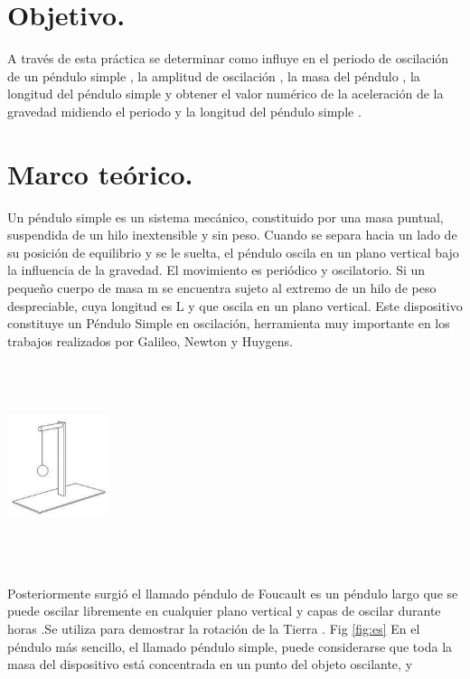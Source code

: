 \documentclass[10pt]{article}
\begin{document}
\begin{multicols}{2}

\section{Objetivo.}
A través de esta práctica se determinar como influye en el periodo de oscilación de un péndulo simple  , la amplitud de oscilación , la masa del péndulo , la longitud del péndulo simple y obtener el valor numérico de la aceleración de la gravedad midiendo el periodo y la longitud del péndulo simple .



\section{Marco teórico.}
Un péndulo simple es un sistema mecánico, constituido por una masa puntual, suspendida de un hilo inextensible y sin peso. Cuando se separa hacia un lado de su posición de equilibrio y se le suelta, el péndulo oscila en un plano vertical bajo la influencia de la gravedad. El movimiento es periódico y oscilatorio. Si un pequeño cuerpo de masa m se encuentra sujeto al extremo de un hilo de peso despreciable, cuya longitud es L y que oscila en un plano vertical. Este dispositivo constituye un Péndulo Simple en oscilación, herramienta muy importante en los trabajos realizados por Galileo, Newton y Huygens.
\begin{center}
	\includegraphics[width=3cm, height=6cm]{Imagenes/pendulo.png}
	\label{fig:es}
\end{center}
Posteriormente surgió el llamado péndulo de Foucault es un péndulo largo que se puede oscilar libremente en cualquier plano vertical y capas de oscilar durante horas .Se utiliza para demostrar la rotación de la Tierra . Fig \ref{fig:es}
En el péndulo más sencillo, el llamado péndulo simple, puede considerarse que
toda la masa del dispositivo está concentrada en un punto del objeto oscilante, y

\end{multicols}
\end{document}
